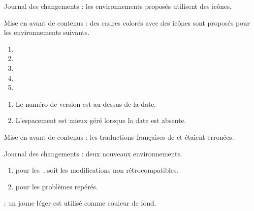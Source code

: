 \begin{tdocnew}
    \item Journal des changements : les environnements proposés utilisent des icônes.


    \item Mise en avant de contenus : des cadres colorés avec des icônes sont proposés pour les environnements suivants.
    \bgroup
    \setlength\multicolsep{5pt}
    \begin{multicols}{3}
        \begin{enumerate}
            \item {}
            \item {}
            \item {}
            \item {}
            \item {}
        \end{enumerate}
    \end{multicols}
    \egroup
\end{tdocnew}

\tdocsep




\begin{tdocupdate}[version = 1.2.0-a, date = 2024-08-23]
    \item {}
    \begin{enumerate}
        \item Le numéro de version est au-dessus de la date.

        \item L'espacement est mieux géré lorsque la date est absente.
    \end{enumerate}
\end{tdocupdate}


\begin{tdocfix}
    \item Mise en avant de contenus : les traductions françaises de  et  étaient erronées.
\end{tdocfix}

\tdocsep




\begin{tdocnew}[version = 1.1.0, date = 2024-01-06]
    \item Journal des changements : deux nouveaux environnements.
    \begin{enumerate}
        \item {} pour les \,, soit les modifications non rétrocompatibles.

        \item {} pour les problèmes repérés.
    \end{enumerate}

    \item {}: un jaune léger est utilisé comme couleur de fond.
\end{tdocnew}

